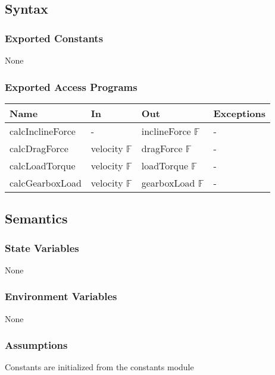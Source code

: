 \documentclass[12pt, titlepage]{article}
\begin{document}
\subsection{Syntax}

\subsubsection{Exported Constants}
None

\subsubsection{Exported Access Programs}

\begin{center}
\begin{tabular}{p{4cm} p{4cm} p{4cm} p{2cm}}
\hline
\textbf{Name} & \textbf{In} & \textbf{Out} & \textbf{Exceptions} \\
\hline
calcInclineForce & - & inclineForce $\mathbb{F}$ & - \\
calcDragForce & velocity $\mathbb{F}$ & dragForce $\mathbb{F}$ & - \\
calcLoadTorque & velocity $\mathbb{F}$ & loadTorque $\mathbb{F}$ & - \\
calcGearboxLoad & velocity $\mathbb{F}$ & gearboxLoad $\mathbb{F}$ & - \\
\hline
\end{tabular}
\end{center}

\subsection{Semantics}

\subsubsection{State Variables}

None

\subsubsection{Environment Variables}

None

\subsubsection{Assumptions}

Constants are initialized from the constants module
\end{document}
